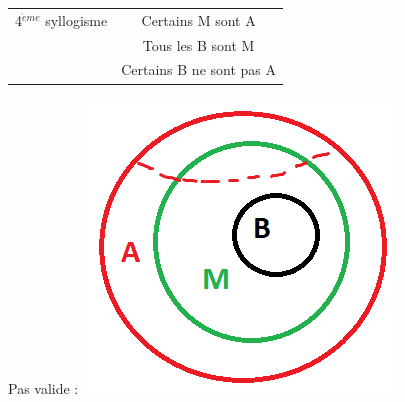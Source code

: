 \begin{frame}

\begin{tabular}{lc}
4$^{\grave{e}me}$ syllogisme & Certains M sont A \\
		& Tous les B sont M \\
\cline{2-2}
		& Certains B ne sont pas A \\
\end{tabular}
\pause

Pas valide : \pause\newline
\includegraphics[scale=0.5]{S4DM3.png}

\end{frame}


